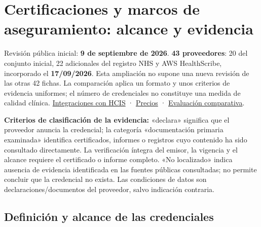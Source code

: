 \clearpage
\section{Certificaciones y marcos de aseguramiento: alcance y evidencia}
\label{app:certificaciones}
\begingroup\footnotesize

Revisión pública inicial: \textbf{9 de septiembre de 2026}. \textbf{43 proveedores}: 20 del conjunto inicial, 22 adicionales del registro NHS y AWS HealthScribe, incorporado el \textbf{17/\allowbreak{}09/\allowbreak{}2026}. Esta ampliación no supone una nueva revisión de las otras 42 fichas. La comparación aplica un formato y unos criterios de evidencia uniformes; el número de credenciales no constituye una medida de calidad clínica. \hyperref[app:hcis]{Integraciones con HCIS} · \hyperref[app:precios]{Precios} · \hyperref[sec:candidatos]{Evaluación comparativa}.

\textbf{Criterios de clasificación de la evidencia:} «declara» significa que el proveedor anuncia la credencial; la categoría «documentación primaria examinada» identifica certificados, informes o registros cuyo contenido ha sido consultado directamente. La verificación íntegra del emisor, la vigencia y el alcance requiere el certificado o informe completo. «No localizado» indica ausencia de evidencia identificada en las fuentes públicas consultadas; no permite concluir que la credencial no exista. Las condiciones de datos son declaraciones/\allowbreak{}documentos del proveedor, salvo indicación contraria.

\subsection*{Definición y alcance de las credenciales}

